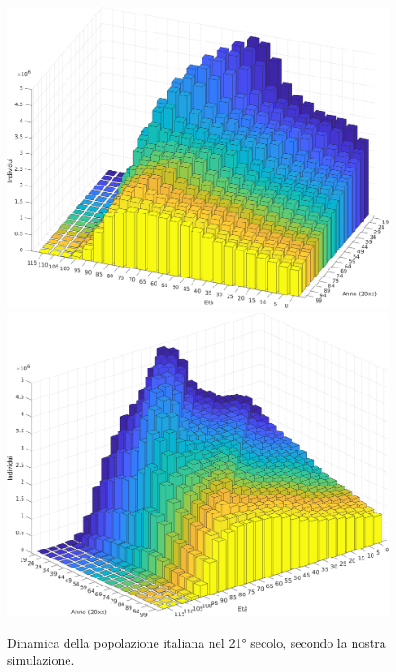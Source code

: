 \begin{figure}[p]
\centering
\includegraphics[height=0.45\textheight]{leslie-dinamica-3D-1.png} \\[1em]
\includegraphics[height=0.45\textheight]{leslie-dinamica-3D-2.png} \vspace{1.5em}
\caption{Dinamica della popolazione italiana nel 21° secolo,
secondo la nostra simulazione.}
\label{fig:leslie-dinamica-3D}
\end{figure}

